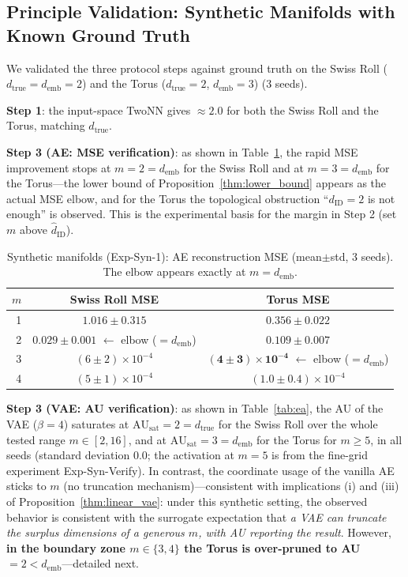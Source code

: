 \documentclass[make,article,submit,pdftex,moreauthors]{Definitions/mdpi}
\newcommand{\dID}{d_{\mathrm{ID}}}
\newcommand{\hatdID}{\hat{d}_{\mathrm{ID}}}
\newcommand{\dtrue}{d_{\mathrm{true}}}
\newcommand{\AUsat}{\mathrm{AU}_{\mathrm{sat}}}
\newcommand{\demb}{d_{\mathrm{emb}}}
\begin{document}
\subsection{Principle Validation: Synthetic Manifolds with Known Ground Truth}\label{sec:exp_syn}

We validated the three protocol steps against ground truth on the Swiss Roll
($\dtrue = \demb = 2$) and the Torus ($\dtrue = 2$, $\demb = 3$)
(3 seeds).

\textbf{Step 1}: the input-space TwoNN gives $\approx 2.0$ for both the
Swiss Roll and the Torus, matching $\dtrue$.

\textbf{Step 3 (AE: MSE verification)}: as shown in Table~\ref{tab:e1}, the
rapid MSE improvement stops at $m = 2 = \demb$ for the Swiss Roll and at
$m = 3 = \demb$ for the Torus---the lower bound of
Proposition~\ref{thm:lower_bound} appears as the actual MSE elbow, and for
the Torus the topological obstruction ``$\dID = 2$ is not enough'' is
observed.
This is the experimental basis for the margin in Step 2 (set $m$ above
$\hatdID$).

\begin{table}[H]
\caption{Synthetic manifolds (Exp-Syn-1): AE reconstruction MSE
(mean$\pm$std, 3 seeds). The elbow appears exactly at $m = \demb$.}
\label{tab:e1}
\small
\begin{tabular}{rcc}
\toprule
$m$ & \textbf{Swiss Roll MSE} & \textbf{Torus MSE} \\
\midrule
1 & $1.016 \pm 0.315$ & $0.356 \pm 0.022$ \\
2 & $\boldsymbol{0.029 \pm 0.001}$ $\leftarrow$ elbow ($= \demb$) & $0.109 \pm 0.007$ \\
3 & $(6 \pm 2) \times 10^{-4}$ & $\boldsymbol{(4 \pm 3) \times 10^{-4}}$ $\leftarrow$ elbow ($= \demb$) \\
4 & $(5 \pm 1) \times 10^{-4}$ & $(1.0 \pm 0.4) \times 10^{-4}$ \\
\bottomrule
\end{tabular}
\end{table}

\textbf{Step 3 (VAE: AU verification)}: as shown in Table~\ref{tab:ea},
the AU of the VAE ($\beta = 4$) saturates at $\AUsat = 2 = \dtrue$ for the
Swiss Roll over the whole tested range $m \in [2, 16]$, and at
$\AUsat = 3 = \demb$ for the Torus for $m \geq 5$, in all seeds (standard
deviation 0.0; the activation at $m = 5$ is from the fine-grid experiment
Exp-Syn-Verify).
In contrast, the coordinate usage of the vanilla AE sticks to $m$ (no
truncation mechanism)---consistent with implications (i) and (iii) of
Proposition~\ref{thm:linear_vae}: under this synthetic setting, the
observed behavior is consistent with the surrogate expectation that
\textit{a VAE can truncate the surplus dimensions of a generous $m$, with
AU reporting the result}.
However, \textbf{in the boundary zone $m \in \{3, 4\}$ the Torus is
over-pruned to AU $= 2 < \demb$}---detailed next.
\end{document}
